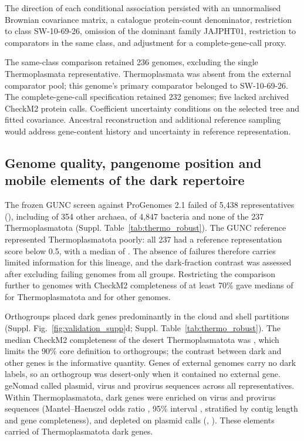 The direction of each conditional association persisted with an unnormalised Brownian
covariance matrix, a catalogue protein-count denominator, restriction to class SW-10-69-26,
omission of the dominant family JAJPHT01, restriction to comparators in the same class,
and adjustment for a complete-gene-call proxy.

The same-class comparison retained 236 genomes,
excluding the single Thermoplasmata representative. Thermoplasmata was absent from the external
comparator pool; this genome's primary comparator belonged to SW-10-69-26. The complete-gene-call specification retained 232 genomes;
five lacked archived CheckM2 protein calls. Coefficient uncertainty conditions on the selected
tree and fitted covariance. Ancestral reconstruction and additional reference sampling would
address gene-content history and uncertainty in reference representation.

\subsection*{Genome quality, pangenome position and mobile elements of the dark repertoire}
The frozen GUNC screen against ProGenomes 2.1 failed  of 5,438 representatives (), including  of 354 other archaea,  of 4,847 bacteria and none of the 237 Thermoplasmatota (Suppl. Table~\ref{tab:thermo_robust}). The GUNC reference represented Thermoplasmatota poorly: all 237 had a reference representation score below 0.5, with a median of . The absence of failures therefore carries limited information for this lineage, and the dark-fraction contrast was assessed after excluding failing genomes from all groups. Restricting the comparison further to genomes with CheckM2 completeness of at least 70\% gave medians of  for  Thermoplasmatota and  for other genomes.

Orthogroups placed dark genes predominantly in the cloud and shell partitions (Suppl. Fig.~\ref{fig:validation_supp}d; Suppl. Table~\ref{tab:thermo_robust}). The median CheckM2 completeness of the desert Thermoplasmatota was , which limits the 90\% core definition to  orthogroups; the contrast between dark and other genes is the informative quantity. Genes of external genomes carry no dark labels, so an orthogroup was desert-only when it contained no external gene. geNomad called  plasmid,  virus and  provirus sequences across all representatives. Within Thermoplasmatota, dark genes were enriched on virus and provirus sequences (Mantel--Haenszel odds ratio , 95\% interval , stratified by contig length and gene completeness), and depleted on plasmid calls (, ). These elements carried  of Thermoplasmatota dark genes.

